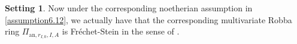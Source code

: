\documentclass[12pt]{amsart}
\theoremstyle{definition}
\numberwithin{equation}{section}
\newtheorem{setting}[theorem]{Setting}
\begin{document}

\begin{setting}
Now under the corresponding noetherian assumption in \cref{assumption6.12}, we actually have that the corresponding multivariate Robba ring $\Pi_{\mathrm{an},r_{I,0},I,A}$	is Fr\'echet-Stein in the sense of \cite[Chapter 3]{ST1}. 
\end{setting}

 
\end{document}
